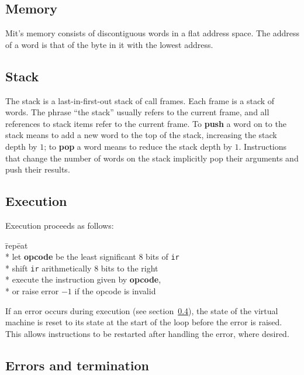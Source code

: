 \documentclass[a4paper]{article}
\begin{document}
\subsection{Memory}

Mit's memory consists of discontiguous words in a flat address space. The address of a word is that of the byte in it with the lowest address.


\subsection{Stack}

The stack is a last-in-first-out stack of call frames. Each frame is a stack of words. The phrase “the stack” usually refers to the current frame, and all references to stack items refer to the current frame. To {\bf push} a word on to the stack means to add a new word to the top of the stack, increasing the stack depth by $1$; to {\bf pop} a word means to reduce the stack depth by $1$. Instructions that change the number of words on the stack implicitly pop their arguments and push their results.


\subsection{Execution}
\label{execution}

Execution proceeds as follows:

\begin{tabbing}
\hspace{0.2in}\=rep\=eat\+\+ \\*
let \textbf{opcode} be the least significant $8$ bits of {\tt ir} \\*
shift {\tt ir} arithmetically $8$ bits to the right \\*
execute the instruction given by \textbf{opcode}, \\*
\hspace{1em}or raise error $-1$ if the opcode is invalid \-
\end{tabbing}

\noindent If an error occurs during execution (see section~\ref{errors}), the state of the virtual machine is reset to its state at the start of the loop before the error is raised. This allows instructions to be restarted after handling the error, where desired.

\subsection{Errors and termination}
\label{errors}
\end{document}
